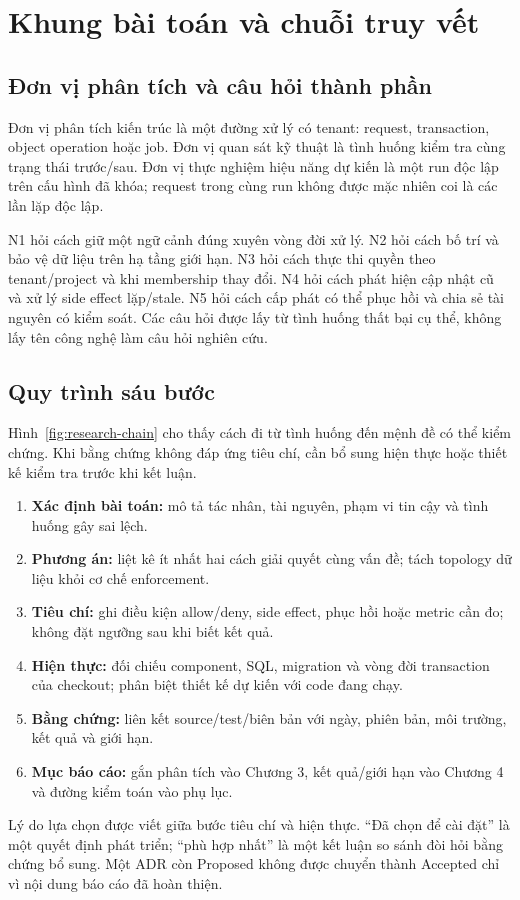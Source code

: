 \section{Khung bài toán và chuỗi truy vết}\label{sec:research-design}
\subsection{Đơn vị phân tích và câu hỏi thành phần}
Đơn vị phân tích kiến trúc là một đường xử lý có tenant: request, transaction, object operation hoặc job. Đơn vị quan sát kỹ thuật là tình huống kiểm tra cùng trạng thái trước\slash sau. Đơn vị thực nghiệm hiệu năng dự kiến là một run độc lập trên cấu hình đã khóa; request trong cùng run không được mặc nhiên coi là các lần lặp độc lập.

N1 hỏi cách giữ một ngữ cảnh đúng xuyên vòng đời xử lý. N2 hỏi cách bố trí và bảo vệ dữ liệu trên hạ tầng giới hạn. N3 hỏi cách thực thi quyền theo tenant\slash project và khi membership thay đổi. N4 hỏi cách phát hiện cập nhật cũ và xử lý side effect lặp\slash stale. N5 hỏi cách cấp phát có thể phục hồi và chia sẻ tài nguyên có kiểm soát. Các câu hỏi được lấy từ tình huống thất bại cụ thể, không lấy tên công nghệ làm câu hỏi nghiên cứu.

\subsection{Quy trình sáu bước}
Hình~\ref{fig:research-chain} cho thấy cách đi từ tình huống đến mệnh đề có thể kiểm chứng. Khi bằng chứng không đáp ứng tiêu chí, cần bổ sung hiện thực hoặc thiết kế kiểm tra trước khi kết luận.
\begin{enumerate}
  \item \textbf{Xác định bài toán:} mô tả tác nhân, tài nguyên, phạm vi tin cậy và tình huống gây sai lệch.
  \item \textbf{Phương án:} liệt kê ít nhất hai cách giải quyết cùng vấn đề; tách topology dữ liệu khỏi cơ chế enforcement.
  \item \textbf{Tiêu chí:} ghi điều kiện allow\slash deny, side effect, phục hồi hoặc metric cần đo; không đặt ngưỡng sau khi biết kết quả.
  \item \textbf{Hiện thực:} đối chiếu component, SQL, migration và vòng đời transaction của checkout; phân biệt thiết kế dự kiến với code đang chạy.
  \item \textbf{Bằng chứng:} liên kết source\slash test\slash biên bản với ngày, phiên bản, môi trường, kết quả và giới hạn.
  \item \textbf{Mục báo cáo:} gắn phân tích vào Chương 3, kết quả\slash giới hạn vào Chương 4 và đường kiểm toán vào phụ lục.
\end{enumerate}

Lý do lựa chọn được viết giữa bước tiêu chí và hiện thực. ``Đã chọn để cài đặt'' là một quyết định phát triển; ``phù hợp nhất'' là một kết luận so sánh đòi hỏi bằng chứng bổ sung. Một ADR còn Proposed không được chuyển thành Accepted chỉ vì nội dung báo cáo đã hoàn thiện.

